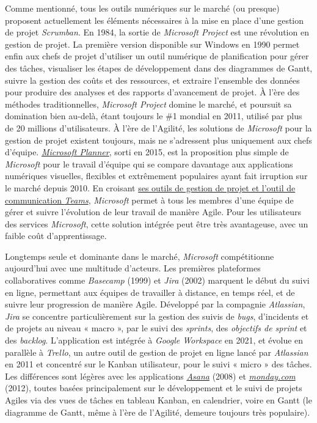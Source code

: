 \documentclass[
  letterpaper,
  DIV=11,
  numbers=noendperiod]{scrreprt}
\begin{document}
Comme mentionné, tous les outils numériques sur le marché (ou presque)
proposent actuellement les éléments nécessaires à la mise en place d'une
gestion de projet \emph{Scrumban}. En 1984, la sortie de \emph{Microsoft
Project} est une révolution en gestion de projet. La première version
disponible sur Windows en 1990 permet enfin aux chefs de projet
d'utiliser un outil numérique de planification pour gérer des tâches,
visualiser les étapes de développement dans des diagrammes de Gantt,
suivre la gestion des coûts et des ressources, et extraire l'ensemble
des données pour produire des analyses et des rapports d'avancement de
projet. À l'ère des méthodes traditionnelles, \emph{Microsoft Project}
domine le marché, et poursuit sa domination bien au-delà, étant toujours
le \#1 mondial en 2011, utilisé par plus de 20 millions d'utilisateurs.
À l'ère de l'Agilité, les solutions de \emph{Microsoft} pour la gestion
de projet existent toujours, mais ne s'adressent plus uniquement aux
chefs d'équipe. \href{https://tasks.office.com/}{\emph{Microsoft
Planner}}, sorti en 2015, est la proposition plus simple de
\emph{Microsoft} pour le travail d'équipe qui se compare davantage aux
applications numériques visuelles, flexibles et extrêmement populaires
ayant fait irruption sur le marché depuis 2010. En croisant
\href{https://www.microsoft.com/fr-ca/microsoft-365/project/agile-methodology}{ses
outils de gestion de projet et l'outil de communication \emph{Teams}},
\emph{Microsoft} permet à tous les membres d'une équipe de gérer et
suivre l'évolution de leur travail de manière Agile. Pour les
utilisateurs des services \emph{Microsoft}, cette solution intégrée peut
être très avantageuse, avec un faible coût d'apprentissage.

Longtemps seule et dominante dans le marché, \emph{Microsoft}
compétitionne aujourd'hui avec une multitude d'acteurs. Les premières
plateformes collaboratives comme \emph{Basecamp} (1999) et \emph{Jira}
(2002) marquent le début du suivi en ligne, permettant aux équipes de
travailler à distance, en temps réel, et de suivre leur progression de
manière Agile. Développé par la compagnie \emph{Atlassian}, \emph{Jira}
se concentre particulièrement sur la gestion des suivis de \emph{bugs},
d'incidents et de projets au niveau « macro », par le suivi des
\emph{sprints}, des \emph{objectifs de sprint} et des \emph{backlog}.
L'application est intégrée à \emph{Google Workspace} en 2021, et évolue
en parallèle à \emph{Trello}, un autre outil de gestion de projet en
ligne lancé par \emph{Atlassian} en 2011 et concentré sur le Kanban
utilisateur, pour le suivi « micro » des tâches. Les différences sont
légères avec les applications \href{https://asana.com/}{\emph{Asana}}
(2008) et \href{monday.com}{\emph{monday.com}} (2012), toutes basées
principalement sur le développement et le suivi de projets Agiles via
des vues de tâches en tableau Kanban, en calendrier, voire en Gantt (le
diagramme de Gantt, même à l'ère de l'Agilité, demeure toujours très
populaire).
\end{document}
